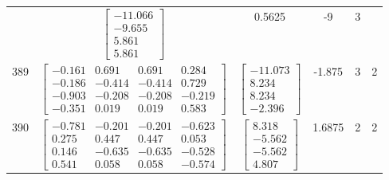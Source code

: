 \documentclass[a4paper,12pt]{article}
\begin{document}
\begin{tabular}{c c c c c c}
&
$\begin{bmatrix} -11.066 \\ -9.655 \\ 5.861 \\ 5.861 \end{bmatrix}$
&
0.5625
&
-9
&
3
\\
389
&
$\begin{bmatrix} -0.161 & 0.691 & 0.691 & 0.284 \\ -0.186 & -0.414 & -0.414 & 0.729 \\ -0.903 & -0.208 & -0.208 & -0.219 \\ -0.351 & 0.019 & 0.019 & 0.583 \end{bmatrix}$
&
$\begin{bmatrix} -11.073 \\ 8.234 \\ 8.234 \\ -2.396 \end{bmatrix}$
&
-1.875
&
3
&
2
\\
390
&
$\begin{bmatrix} -0.781 & -0.201 & -0.201 & -0.623 \\ 0.275 & 0.447 & 0.447 & 0.053 \\ 0.146 & -0.635 & -0.635 & -0.528 \\ 0.541 & 0.058 & 0.058 & -0.574 \end{bmatrix}$
&
$\begin{bmatrix} 8.318 \\ -5.562 \\ -5.562 \\ 4.807 \end{bmatrix}$
&
1.6875
&
2
&
2
\\
\end{tabular} \egroup \newpage
\end{document}
